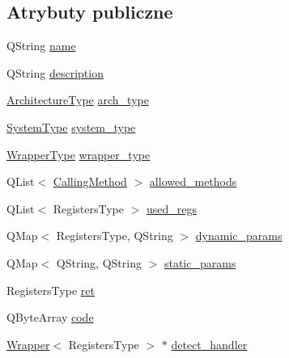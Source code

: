 \subsection*{Atrybuty publiczne}
\begin{DoxyCompactItemize}
\item 
Q\-String \hyperlink{class_d_adding_methods_1_1_wrapper_a41c5e8fdd7bde2f8610d2d499ae8f4b3}{name}
\item 
Q\-String \hyperlink{class_d_adding_methods_1_1_wrapper_a1f27a97876d639a2e39482c4a3a6d274}{description}
\item 
\hyperlink{class_d_adding_methods_a7d062c443c04f37689dbececc36cf4a3}{Architecture\-Type} \hyperlink{class_d_adding_methods_1_1_wrapper_aa4f2505d3abca144ceaae01692ab2982}{arch\-\_\-type}
\item 
\hyperlink{class_d_adding_methods_a14e87405d457c7c3671eca0e74b3f327}{System\-Type} \hyperlink{class_d_adding_methods_1_1_wrapper_ae298975da4ef638bef00c8277501eddc}{system\-\_\-type}
\item 
\hyperlink{class_d_adding_methods_1_1_wrapper_acb6db05ae66304ccd8b53c49221e0b09}{Wrapper\-Type} \hyperlink{class_d_adding_methods_1_1_wrapper_aaa1e1c8e0902c6241c714498dc9e5316}{wrapper\-\_\-type}
\item 
Q\-List$<$ \hyperlink{class_d_adding_methods_a8b52c07f1794d8c6cdd6f9b98be2bbf0}{Calling\-Method} $>$ \hyperlink{class_d_adding_methods_1_1_wrapper_a7365bd260c137feafcdc7abde67ffedc}{allowed\-\_\-methods}
\item 
Q\-List$<$ Registers\-Type $>$ \hyperlink{class_d_adding_methods_1_1_wrapper_aba0dc1a5f9addd4317b87e92fb2eb0db}{used\-\_\-regs}
\item 
Q\-Map$<$ Registers\-Type, Q\-String $>$ \hyperlink{class_d_adding_methods_1_1_wrapper_ac11ddb3500c96e6175c4b939cc726d4d}{dynamic\-\_\-params}
\item 
Q\-Map$<$ Q\-String, Q\-String $>$ \hyperlink{class_d_adding_methods_1_1_wrapper_a915ee3066596bebdc8f2c21c6cf5b9bc}{static\-\_\-params}
\item 
Registers\-Type \hyperlink{class_d_adding_methods_1_1_wrapper_ae7d3f4a32619b51a7f0f0e53fbc87d38}{ret}
\item 
Q\-Byte\-Array \hyperlink{class_d_adding_methods_1_1_wrapper_a1280984042d8167b8207d33488189415}{code}
\item 
\hyperlink{class_d_adding_methods_1_1_wrapper}{Wrapper}$<$ Registers\-Type $>$ $\ast$ \hyperlink{class_d_adding_methods_1_1_wrapper_aaa3fdb9659e74c099359cc0af48e4233}{detect\-\_\-handler}
\end{DoxyCompactItemize}


